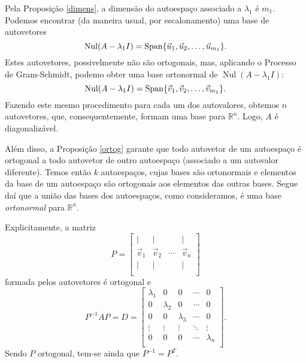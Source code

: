 \documentclass[../livro.tex]{subfiles}
\begin{document}
Pela Proposição \ref{dimens}, a dimensão do autoespaço associado a $\lambda_1$ é $m_1$. Podemos encontrar (da maneira usual, por escalonamento) uma base de autovetores
\begin{equation}
\operatorname{Nul} (A - \lambda_1 I) = \operatorname{Span} \{ \vec{u}_1, \vec{u}_2, \dots, \vec{u}_{m_1} \}.
\end{equation} Estes autovetores, possivelmente não são ortogonais, mas, aplicando o Processo de Gram-Schmidt, podemo obter uma base ortonormal de $\operatorname{Nul} (A - \lambda_1 I)$:
\begin{equation}
\operatorname{Nul} (A - \lambda_1 I) = \operatorname{Span} \{ \vec{v}_1, \vec{v}_2, \dots, \vec{v}_{m_1} \}.
\end{equation} Fazendo este mesmo procedimento para cada um dos autovalores, obtemos $n$ autovetores, que, consequentemente, formam uma base para $\mathbb{R}^n$. Logo, $A$ é diagonalizável.

Além disso, a Proposição \ref{ortog} garante que todo autovetor de um autoespaço é ortogonal a todo autovetor de outro autoespaço (associado a um autovalor diferente). Temos então $k$ autoespaços, cujas bases são ortonormais e elementos da base de um autoespaço são ortogonais aos elementos das outras bases. Segue daí que a união das bases dos autoespaços, como consideramos, é uma base \textit{ortonormal} para $\mathbb{R}^n$.

Explicitamente, a matriz
\begin{equation}
P = 
\begin{bmatrix}
| & | & & | \\
\vec{v}_1 & \vec{v}_2 & \cdots &  \vec{v}_n \\
| & | &  & | \\
\end{bmatrix}
\end{equation} formada pelos autovetores é ortogonal e 
\begin{equation}
P^{-1} A P = D = 
\begin{bmatrix}
\lambda_1 & 0 & 0 & \cdots & 0 \\ 
0 & \lambda_2 & 0 & \cdots & 0 \\ 
0 & 0 & \lambda_3 & \cdots & 0 \\ 
\vdots & \vdots & \vdots & \ddots & \vdots \\ 
0 & 0 & 0 & \cdots & \lambda_n \\ 
\end{bmatrix}.
\end{equation} Sendo $P$ ortogonal, tem-se ainda que $P^{-1} = P^T$.
\end{document}
